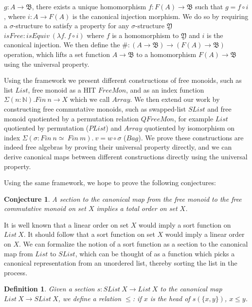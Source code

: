 \documentclass{article}
\begin{document}
$g : A \rightarrow \mathfrak{B}$, there exists a unique homomorphism $f : F(A) \rightarrow \mathfrak{B}$ such that
$g = f \circ i$, where $i : A \rightarrow F(A)$ is the canonical injection morphism. We do so by requiring a
$\sigma$-structure to satisfy a property for any $\sigma$-structure $\mathfrak{Y}$
$isFree : isEquiv \: (\lambda f. \: f \circ i)$ where $f$ is a homomorphism to $\mathfrak{Y}$ and
$i$ is the canonical injection.
We then define the $\# : (A \rightarrow \mathfrak{B}) \rightarrow (F(A) \rightarrow \mathfrak{B})$ operation, which lifts
a set function $A \rightarrow \mathfrak{B}$ to a homomorphism $F(A) \rightarrow \mathfrak{B}$ using
the universal property.

Using the framework we present different constructions of free monoids,
such as list $List$, free monoid as a HIT $FreeMon$, and as an index function $\Sigma (n : \mathbb{N}). Fin \: n \rightarrow X$ which we call $Array$.
We then extend our work by constructing free commutative monoids,
such as swapped-list $SList$ and free monoid quotiented by a permutation relation $QFreeMon$,
for example $List$ quotiented by permutation ($PList$)
and $Array$ quotiented by isomorphism on index $\Sigma (\sigma : Fin \: n \simeq \: Fin \: m). \: v = w \circ \sigma$ ($Bag$).
We prove these constructions are indeed free algebras by proving their universal property directly,
and we can derive canonical maps between different constructions directly using the universal property.

Using the same framework, we hope to prove the following conjectures:

\newtheorem{myconj}{Conjecture}
\newtheorem{mydef}{Definition}
\newtheorem{mylemma}{Lemma}
\newtheorem{mythm}{Proposition}

\begin{myconj}
    A section to the canonical map from the free monoid to the free commutative monoid on set $X$ implies a total order on set $X$.
\end{myconj}
It is well known that a linear order on set $X$ would imply a sort function on $List \: X$. It should follow that a sort function on set $X$
would imply a linear order on $X$. We can formalize the notion of a sort function as a section to the canonical map from $List$ to
$SList$, which can be thought of as a function which picks a canonical representation from an unordered list, thereby sorting
the list in the process.

\begin{mydef}
    Given a section $s : SList \: X \rightarrow List \: X$ to the canonical map $List \: X \rightarrow SList \: X$,
    we define a relation $\leq$: if $x$ is the head of $s(\{x, y\})$, $x \leq y$.
\end{mydef}
\end{document}
